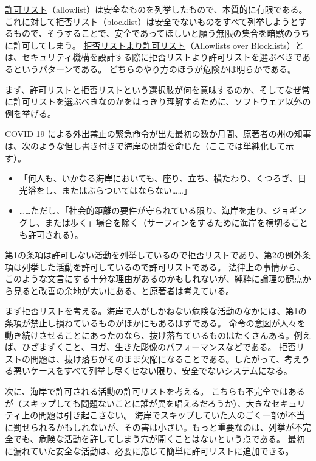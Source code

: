 \documentclass[uplatex]{jsarticle}
\def\label#1{}%
\begin{document}
\begin{dfn}[許可リストと拒否リスト]\label{dfn:ch4-allowlist-blocklist}
\underline{許可リスト}（allowlist）は安全なものを列挙したもので、本質的に有限である。
これに対して\underline{拒否リスト}（blocklist）は安全でないものをすべて列挙しようとするもので、そうすることで、安全であってほしいと願う無限の集合を暗黙のうちに許可してしまう。
\underline{拒否リストより許可リスト}（Allowlists over Blocklists）とは、セキュリティ機構を設計する際に拒否リストより許可リストを選ぶべきであるというパターンである。
どちらのやり方のほうが危険かは明らかである。
\end{dfn}

まず、許可リストと拒否リストという選択肢が何を意味するのか、そしてなぜ常に許可リストを選ぶべきなのかをはっきり理解するために、ソフトウェア以外の例を挙げる。

\begin{exa}\label{exa:ch4-beach-closure}
COVID-19 による外出禁止の緊急命令が出た最初の数か月間、原著者の州の知事は、次のような但し書き付きで海岸の閉鎖を命じた（ここでは単純化して示す）。
\begin{itemize}
\item 「何人も、いかなる海岸においても、座り、立ち、横たわり、くつろぎ、日光浴をし、またはぶらついてはならない……」
\item ……ただし、「社会的距離の要件が守られている限り、海岸を走り、ジョギングし、または歩く」場合を除く（サーフィンをするために海岸を横切ることも許可される）。
\end{itemize}
第1の条項は許可しない活動を列挙しているので拒否リストであり、第2の例外条項は列挙した活動を許可しているので許可リストである。
法律上の事情から、このような文言にする十分な理由があるのかもしれないが、純粋に論理の観点から見ると改善の余地が大いにある、と原著者は考えている。

まず拒否リストを考える。海岸で人がしかねない危険な活動のなかには、第1の条項が禁止し損ねているものがほかにもあるはずである。
命令の意図が人々を動き続けさせることにあったのなら、抜け落ちているものはたくさんある。例えば、ひざまずくこと、ヨガ、生きた彫像のパフォーマンスなどである。
拒否リストの問題は、抜け落ちがそのまま欠陥になることである。したがって、考えうる悪いケースをすべて列挙し尽くせない限り、安全でないシステムになる。

次に、海岸で許可される活動の許可リストを考える。
こちらも不完全ではあるが（スキップしても問題ないことに誰が異を唱えるだろうか）、大きなセキュリティ上の問題は引き起こさない。
海岸でスキップしていた人のごく一部が不当に罰せられるかもしれないが、その害は小さい。もっと重要なのは、列挙が不完全でも、危険な活動を許してしまう穴が開くことはないという点である。
最初に漏れていた安全な活動は、必要に応じて簡単に許可リストに追加できる。
\end{exa}
\end{document}
